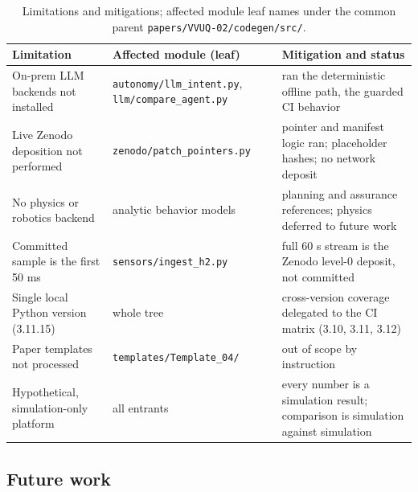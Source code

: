 \begin{table}[H]
\caption{Limitations and mitigations; affected module leaf names under the common
parent \texttt{papers/VVUQ-02/codegen/src/}.}
\label{tab:limitations}
\centering
\footnotesize
\begin{tabularx}{\textwidth}{Y L{3.1cm} Y}
\toprule
\textbf{Limitation} & \textbf{Affected module (leaf)} & \textbf{Mitigation and status} \\
\midrule
On-prem LLM backends not installed & \texttt{autonomy/llm\_intent.py}, \texttt{llm/compare\_agent.py} & ran the deterministic offline path, the guarded CI behavior \\
Live Zenodo deposition not performed & \texttt{zenodo/patch\_pointers.py} & pointer and manifest logic ran; placeholder hashes; no network deposit \\
No physics or robotics backend & analytic behavior models & planning and assurance references; physics deferred to future work \\
Committed sample is the first 50 ms & \texttt{sensors/ingest\_h2.py} & full 60 s stream is the Zenodo level-0 deposit, not committed \\
Single local Python version (3.11.15) & whole tree & cross-version coverage delegated to the CI matrix (3.10, 3.11, 3.12) \\
Paper templates not processed & \texttt{templates/Template\_04/} & out of scope by instruction \\
Hypothetical, simulation-only platform & all entrants & every number is a simulation result; comparison is simulation against simulation \\
\bottomrule
\end{tabularx}
\end{table}

\subsection{Future work}

